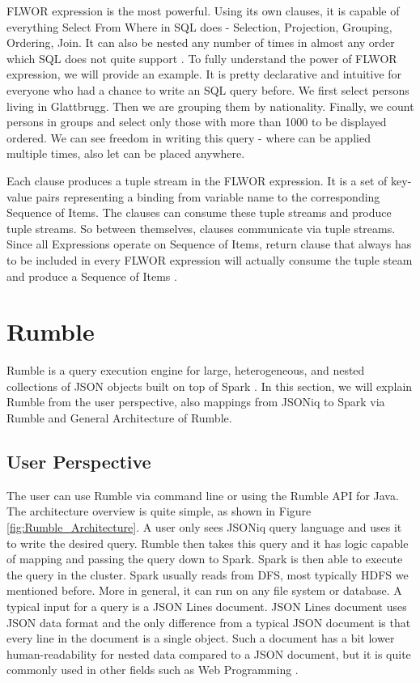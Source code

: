 FLWOR expression is the most powerful. Using its own clauses, it is capable of everything Select From Where in SQL does - Selection, Projection, Grouping, Ordering, Join. It can also be nested any number of times in almost any order which SQL does not quite support \cite{JSONiqBook}. To fully understand the power of FLWOR expression, we will provide an example. It is pretty declarative and intuitive for everyone who had a chance to write an SQL query before. We first select persons living in Glattbrugg. Then we are grouping them by nationality. Finally, we count persons in groups and select only those with more than 1000 to be displayed ordered. We can see freedom in writing this query - where can be applied multiple times, also let can be placed anywhere.



Each clause produces a tuple stream in the FLWOR expression. It is a set of key-value pairs representing a binding from variable name to the corresponding Sequence of Items. The clauses can consume these tuple streams and produce tuple streams. So between themselves, clauses communicate via tuple streams. Since all Expressions operate on Sequence of Items, return clause that always has to be included in every FLWOR expression will actually consume the tuple steam and produce a Sequence of Items \cite{JSONiqBook}.
   
\section{Rumble}
Rumble is a query execution engine for large, heterogeneous, and nested collections of JSON objects built on top of Spark \cite{RumblePaper}. In this section, we will explain Rumble from the user perspective, also mappings from JSONiq to Spark via Rumble and General Architecture of Rumble.
\subsection{User Perspective}
The user can use Rumble via command line or using the Rumble API for Java. The architecture overview is quite simple, as shown in Figure \ref{fig:Rumble_Architecture}. A user only sees JSONiq query language and uses it to write the desired query. Rumble then takes this query and it has logic capable of mapping and passing the query down to Spark. Spark is then able to execute the query in the cluster. Spark usually reads from DFS, most typically HDFS we mentioned before. More in general, it can run on any file system or database. A typical input for a query is a JSON Lines document. JSON Lines document uses JSON data format and the only difference from a typical JSON document is that every line in the document is a single object. Such a document has a bit lower human-readability for nested data compared to a JSON document, but it is quite commonly used in other fields such as Web Programming \cite{RumbleYouTube}.

